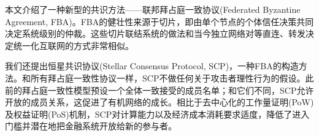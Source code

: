 \abstract{}
本文介绍了一种新型的共识方法——联邦拜占庭一致协议(Federated Byzantine Agreement, FBA)。FBA的健壮性来源于{\quorum}切片，即由单个节点的个体信任决策共同决定系统级别的仲裁。这些切片联结系统的做法和当今独立网络对等直连、转发决定统一化互联网的方式非常相似。

我们还提出恒星共识协议(Stellar Consensus Protocol, SCP)，一种FBA的构造方法。和所有拜占庭一致性协议一样，SCP不做任何关于攻击者理性行为的假设。此前的拜占庭一致性模型预设一个全体一致接受的成员名单；和它们不同，SCP允许开放的成员关系，这促进了有机网络的成长。相比于去中心化的工作量证明(PoW)及权益证明(PoS)机制，SCP对计算能力以及经济成本消耗要求适度，降低了进入门槛并潜在地把金融系统开放给新的参与者。